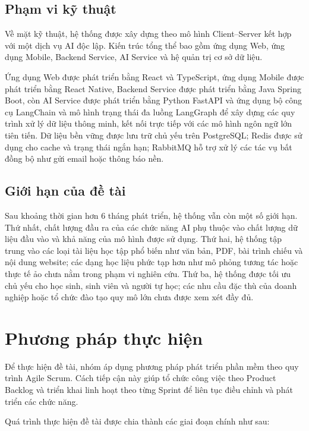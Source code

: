 \subsection{Phạm vi kỹ thuật}

Về mặt kỹ thuật, hệ thống được xây dựng theo mô hình Client--Server kết hợp với một dịch vụ AI độc lập. Kiến trúc tổng thể bao gồm ứng dụng Web, ứng dụng Mobile, Backend Service, AI Service và hệ quản trị cơ sở dữ liệu.

Ứng dụng Web được phát triển bằng React và TypeScript, ứng dụng Mobile được phát triển bằng React Native, Backend Service được phát triển bằng Java Spring Boot, còn AI Service được phát triển bằng Python FastAPI và ứng dụng bộ công cụ LangChain và mô hình trạng thái đa luồng LangGraph để xây dựng các quy trình xử lý dữ liệu thông minh, kết nối trực tiếp với các mô hình ngôn ngữ lớn tiên tiến. Dữ liệu bền vững được lưu trữ chủ yếu trên PostgreSQL; Redis được sử dụng cho cache và trạng thái ngắn hạn; RabbitMQ hỗ trợ xử lý các tác vụ bất đồng bộ như gửi email hoặc thông báo nền.

\subsection{Giới hạn của đề tài}

Sau khoảng thời gian hơn 6 tháng phát triển, hệ thống vẫn còn một số giới hạn. Thứ nhất, chất lượng đầu ra của các chức năng AI phụ thuộc vào chất lượng dữ liệu đầu vào và khả năng của mô hình được sử dụng. Thứ hai, hệ thống tập trung vào các loại tài liệu học tập phổ biến như văn bản, PDF, bài trình chiếu và nội dung website; các dạng học liệu phức tạp hơn như mô phỏng tương tác hoặc thực tế ảo chưa nằm trong phạm vi nghiên cứu. Thứ ba, hệ thống được tối ưu chủ yếu cho học sinh, sinh viên và người tự học; các nhu cầu đặc thù của doanh nghiệp hoặc tổ chức đào tạo quy mô lớn chưa được xem xét đầy đủ.


\section{Phương pháp thực hiện}

Để thực hiện đề tài, nhóm áp dụng phương pháp phát triển phần mềm theo quy trình Agile Scrum. Cách tiếp cận này giúp tổ chức công việc theo Product Backlog và triển khai linh hoạt theo từng Sprint để liên tục điều chỉnh và phát triển các chức năng. 

Quá trình thực hiện đề tài được chia thành các giai đoạn chính như sau:

